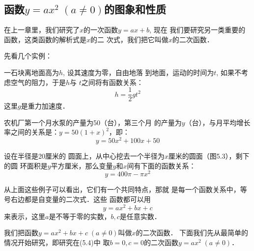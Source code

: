 \subsection{函数$y=ax^2\; (a\ne 0)$的图象和性质}
在上一章里，我们研究了$x$的一次函数$y=ax+b$, 现在
我们要研究另一类重要的函数，这类函数的解析式是$x$的二
次式，我们把它叫做$x$的二次函数．

先看几个实例：

\begin{example}
    一石块离地面高为$h$, 设其速度为零，自由地落
到地面，运动的时间为$t$, 如果不考虑空气的阻力，于是$h$与
$t$之间将有函数关系：
\begin{equation}
 h=\frac{1}{2}gt^2   
\end{equation}
这里$g$是重力加速度．
\end{example}

\begin{example}
    农机厂第一个月水泵的产量为50（台），第三个月
的产量为$y$（台），与月平均增长
率之间的关系是：$y=50(1+x)^2$，即：
\begin{equation}
  y=50x^2+100x+50  
\end{equation}
\end{example}

\begin{example}
    设在半径是20厘米的
圆面上，从中心挖去一个半径为$x$厘米的圆面（图5.3），剩下的圆
环面积是$y$平方厘米，那么变量$y$和$x$间有下面的函数关系：
\begin{equation}
    y=400\pi-\pi x^2
\end{equation}
\end{example}

\begin{figure}[htp]
    \centering
{}    
    \caption{}
\end{figure}

从上面这些例子可以看出，它们有一个共同特点，那就
是每一个函数关系中，等号右边都是自变量的二次式．这些
函数都可以用
\begin{equation}
    y=ax^2+bx+c
\end{equation}
来表示，这里$a$是不等于零的实数，$b,c$是任意实数．

我们把函数$y=ax^2+bx+c\; (a\ne 0)$叫做$x$的二次函数．
下面我们先从最简单的情况开始研究，即研究在(5.4)中
取$b=0,c=0$的二次函数$y=ax^2\; (a\ne 0)$．

